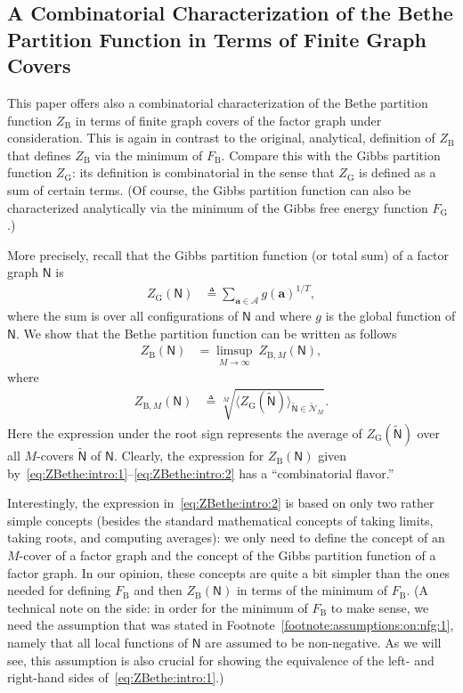 \documentclass[journal, twocolumn]{IEEEtran}
\renewcommand{\mathbf}[1]{{\bm{#1}}}
\newcommand{\vect}[1]{\mathbf{#1}}
\newcommand{\set}[1]{\mathcal{#1}}
\newcommand{\graph}[1]{\mathsf{#1}}
\newcommand{\defeq}{\triangleq}
\newcommand{\setA}{\set{A}}
\newcommand{\va}{\vect{a}}
\newcommand{\graphN}{\graph{N}}
\newcommand{\FBethe}{F_{\mathrm{B}}}
\newcommand{\ZBethe}{Z_{\mathrm{B}}}
\newcommand{\ZBetheM}[1]{Z_{\mathrm{B}, #1}}
\newcommand{\cover}[1]{\tilde{#1}}
\newcommand{\cset}[1]{\cover{\set{#1}}}
\newcommand{\cgraph}[1]{\cover{\graph{#1}}}
\newcommand{\?}{\mathrm{?}}
\newcommand{\FGibbs}{F_{\mathrm{G}}}
\newcommand{\ZGibbs}{Z_{\mathrm{G}}}
\begin{document}
\subsection{A Combinatorial Characterization of the Bethe Partition Function
                         in Terms of Finite Graph Covers}



This paper offers also a combinatorial characterization of the Bethe partition
function $\ZBethe$ in terms of finite graph covers of the factor graph under
consideration. This is again in contrast to the original, analytical,
definition of $\ZBethe$ that defines $\ZBethe$ via the minimum of
$\FBethe$. Compare this with the Gibbs partition function $\ZGibbs$: its
definition is combinatorial in the sense that $\ZGibbs$ is defined as a sum of
certain terms. (Of course, the Gibbs partition function can also be
characterized analytically via the minimum of the Gibbs free energy function
$\FGibbs$.)

More precisely, recall that the Gibbs partition function (or total sum) of a
factor graph $\graphN$ is
\begin{align*}
  \ZGibbs(\graphN)
    &\defeq
       \sum_{\va \in \setA}
         g(\va)^{1/T},
\end{align*}
where the sum is over all configurations of $\graphN$ and where $g$ is the
global function of $\graphN$. We show that the Bethe partition function can be
written as follows
\begin{align}
  \ZBethe(\graphN)
    &= \limsup_{M \to \infty} \ 
         \ZBetheM{M}(\graphN),
           \label{eq:ZBethe:intro:1}
\end{align}
where
\begin{align}
  \ZBetheM{M}(\graphN)
    &\defeq
       \sqrt[M]{\Big\langle \!
                  \ZGibbs(\cgraph{N})
                \! \Big\rangle_{\cgraph{N} \in \cset{N}_{M}}}.
                             \label{eq:ZBethe:intro:2}
\end{align}
Here the expression under the root sign represents the average of
$\ZGibbs(\cgraph{N})$ over all $M$-covers $\cgraph{N}$ of $\graphN$. Clearly,
the expression for $\ZBethe(\graphN)$ given
by~\eqref{eq:ZBethe:intro:1}--\eqref{eq:ZBethe:intro:2} has a ``combinatorial
flavor.''

Interestingly, the expression in~\eqref{eq:ZBethe:intro:2} is based on only
two rather simple concepts (besides the standard mathematical concepts of
taking limits, taking roots, and computing averages): we only need to define
the concept of an $M$-cover of a factor graph and the concept of the Gibbs
partition function of a factor graph. In our opinion, these concepts are quite
a bit simpler than the ones needed for defining $\FBethe$ and then
$\ZBethe(\graphN)$ in terms of the minimum of $\FBethe$. (A technical note on
the side: in order for the minimum of $\FBethe$ to make sense, we need the
assumption that was stated in Footnote~\ref{footnote:assumptions:on:nfg:1},
namely that all local functions of $\graphN$ are assumed to be
non-negative. As we will see, this assumption is also crucial for showing the
equivalence of the left- and right-hand sides of~\eqref{eq:ZBethe:intro:1}.)
\end{document}
